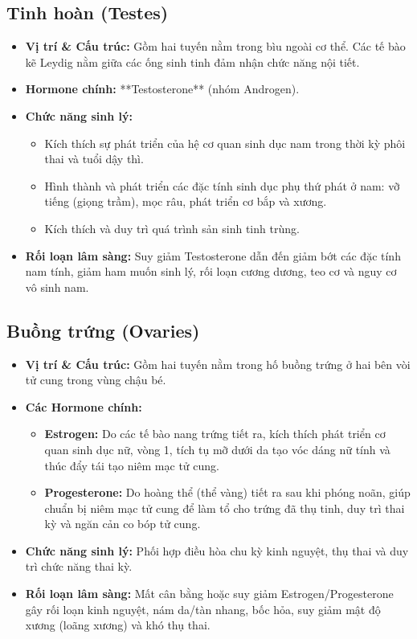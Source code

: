 \subsection{Tinh hoàn (Testes)}
\begin{itemize}
    \item \textbf{Vị trí \& Cấu trúc:} Gồm hai tuyến nằm trong bìu ngoài cơ thể. Các tế bào kẽ Leydig nằm giữa các ống sinh tinh đảm nhận chức năng nội tiết.
    \item \textbf{Hormone chính:} **Testosterone** (nhóm Androgen).
    \item \textbf{Chức năng sinh lý:}
    \begin{itemize}
        \item Kích thích sự phát triển của hệ cơ quan sinh dục nam trong thời kỳ phôi thai và tuổi dậy thì.
        \item Hình thành và phát triển các đặc tính sinh dục phụ thứ phát ở nam: vỡ tiếng (giọng trầm), mọc râu, phát triển cơ bắp và xương.
        \item Kích thích và duy trì quá trình sản sinh tinh trùng.
    \end{itemize}
    \item \textbf{Rối loạn lâm sàng:} Suy giảm Testosterone dẫn đến giảm bớt các đặc tính nam tính, giảm ham muốn sinh lý, rối loạn cương dương, teo cơ và nguy cơ vô sinh nam.
\end{itemize}

\subsection{Buồng trứng (Ovaries)}
\begin{itemize}
    \item \textbf{Vị trí \& Cấu trúc:} Gồm hai tuyến nằm trong hố buồng trứng ở hai bên vòi tử cung trong vùng chậu bé.
    \item \textbf{Các Hormone chính:}
    \begin{itemize}
        \item \textbf{Estrogen:} Do các tế bào nang trứng tiết ra, kích thích phát triển cơ quan sinh dục nữ, vòng 1, tích tụ mỡ dưới da tạo vóc dáng nữ tính và thúc đẩy tái tạo niêm mạc tử cung.
        \item \textbf{Progesterone:} Do hoàng thể (thể vàng) tiết ra sau khi phóng noãn, giúp chuẩn bị niêm mạc tử cung để làm tổ cho trứng đã thụ tinh, duy trì thai kỳ và ngăn cản co bóp tử cung.
    \end{itemize}
    \item \textbf{Chức năng sinh lý:} Phối hợp điều hòa chu kỳ kinh nguyệt, thụ thai và duy trì chức năng thai kỳ.
    \item \textbf{Rối loạn lâm sàng:} Mất cân bằng hoặc suy giảm Estrogen/Progesterone gây rối loạn kinh nguyệt, nám da/tàn nhang, bốc hỏa, suy giảm mật độ xương (loãng xương) và khó thụ thai.
\end{itemize}

